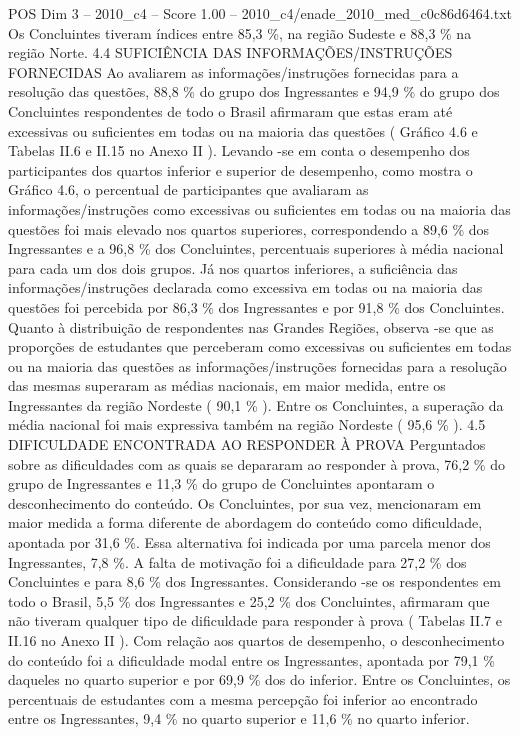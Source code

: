 \begin{textsample}{POS Dim 3 – 2010\_c4 – Score 1.00 – 2010\_c4/enade\_2010\_med\_c0c86d6464.txt}
Os Concluintes tiveram índices entre 85,3 \%, na região Sudeste e 88,3 \% na região Norte. 4.4 SUFICIÊNCIA DAS INFORMAÇÕES/INSTRUÇÕES FORNECIDAS Ao avaliarem as informações/instruções fornecidas para a resolução das questões, 88,8 \% do grupo dos Ingressantes e 94,9 \% do grupo dos Concluintes respondentes de todo o Brasil afirmaram que estas eram até excessivas ou suficientes em todas ou na maioria das questões ( Gráfico 4.6 e Tabelas II.6 e II.15 no Anexo II ).
Levando -se em conta o desempenho dos participantes dos quartos inferior e superior de desempenho, como mostra o Gráfico 4.6, o percentual de participantes que avaliaram as informações/instruções como excessivas ou suficientes em todas ou na maioria das questões foi mais elevado nos quartos superiores, correspondendo a 89,6 \% dos Ingressantes e a 96,8 \% dos Concluintes, percentuais superiores à média nacional para cada um dos dois grupos.
Já nos quartos inferiores, a suficiência das informações/instruções declarada como excessiva em todas ou na maioria das questões foi percebida por 86,3 \% dos Ingressantes e por 91,8 \% dos Concluintes.
Quanto à distribuição de respondentes nas Grandes Regiões, observa -se que as proporções de estudantes que perceberam como excessivas ou suficientes em todas ou na maioria das questões as informações/instruções fornecidas para a resolução das mesmas superaram as médias nacionais, em maior medida, entre os Ingressantes da região Nordeste ( 90,1 \% ).
Entre os Concluintes, a superação da média nacional foi mais expressiva também na região Nordeste ( 95,6 \% ). 4.5 DIFICULDADE ENCONTRADA AO RESPONDER À PROVA Perguntados sobre as dificuldades com as quais se depararam ao responder à prova, 76,2 \% do grupo de Ingressantes e 11,3 \% do grupo de Concluintes apontaram o desconhecimento do conteúdo.
Os Concluintes, por sua vez, mencionaram em maior medida a forma diferente de abordagem do conteúdo como dificuldade, apontada por 31,6 \%.
Essa alternativa foi indicada por uma parcela menor dos Ingressantes, 7,8 \%.
A falta de motivação foi a dificuldade para 27,2 \% dos Concluintes e para 8,6 \% dos Ingressantes.
Considerando -se os respondentes em todo o Brasil, 5,5 \% dos Ingressantes e 25,2 \% dos Concluintes, afirmaram que não tiveram qualquer tipo de dificuldade para responder à prova ( Tabelas II.7 e II.16 no Anexo II ).
Com relação aos quartos de desempenho, o desconhecimento do conteúdo foi a dificuldade modal entre os Ingressantes, apontada por 79,1 \% daqueles no quarto superior e por 69,9 \% dos do inferior.
Entre os Concluintes, os percentuais de estudantes com a mesma percepção foi inferior ao encontrado entre os Ingressantes, 9,4 \% no quarto superior e 11,6 \% no quarto inferior.

\end{textsample}
